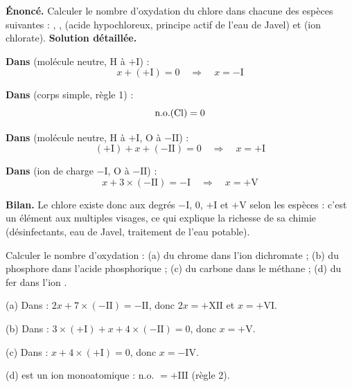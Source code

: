 \documentclass[11pt]{article}
\begin{document}
\begin{exoresolu}
\textbf{Énoncé.} Calculer le nombre d'oxydation du chlore dans chacune des espèces suivantes : , ,  (acide hypochloreux, principe actif de l'eau de Javel) et  (ion chlorate).
\tcblower
\textbf{Solution détaillée.}

\textbf{Dans } (molécule neutre, H à $+\mathrm{I}$) :
\[ x + (+\mathrm{I}) = 0 \quad\Longrightarrow\quad x = -\mathrm{I} \]

\textbf{Dans } (corps simple, règle 1) :
\[ \text{n.o.}(\ce{Cl}) = 0 \]

\textbf{Dans } (molécule neutre, H à $+\mathrm{I}$, O à $-\mathrm{II}$) :
\[ (+\mathrm{I}) + x + (-\mathrm{II}) = 0 \quad\Longrightarrow\quad x = +\mathrm{I} \]

\textbf{Dans } (ion de charge $-\mathrm{I}$, O à $-\mathrm{II}$) :
\[ x + 3 \times (-\mathrm{II}) = -\mathrm{I} \quad\Longrightarrow\quad x = +\mathrm{V} \]

\textbf{Bilan.} Le chlore existe donc aux degrés $-\mathrm{I}$, $0$, $+\mathrm{I}$ et $+\mathrm{V}$ selon les espèces : c'est un élément aux multiples visages, ce qui explique la richesse de sa chimie (désinfectants, eau de Javel, traitement de l'eau potable).
\end{exoresolu}

\begin{exercice}
Calculer le nombre d'oxydation : (a) du chrome dans l'ion dichromate  ; (b) du phosphore dans l'acide phosphorique  ; (c) du carbone dans le méthane  ; (d) du fer dans l'ion .
\end{exercice}

\begin{corrige}
(a) Dans  : $2x + 7 \times (-\mathrm{II}) = -\mathrm{II}$, donc $2x = +\mathrm{XII}$ et $x = +\mathrm{VI}$.

(b) Dans  : $3 \times (+\mathrm{I}) + x + 4 \times (-\mathrm{II}) = 0$, donc $x = +\mathrm{V}$.

(c) Dans  : $x + 4 \times (+\mathrm{I}) = 0$, donc $x = -\mathrm{IV}$.

(d)  est un ion monoatomique : n.o. $= +\mathrm{III}$ (règle 2).
\end{corrige}
\end{document}
